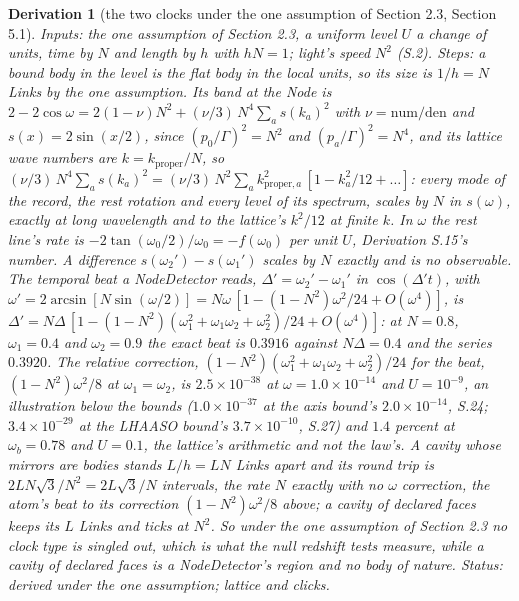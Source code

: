 \documentclass[pdflatex,sn-mathphys-num]{sn-jnl}
\newcommand{\num}{\mathrm{num}}
\newcommand{\den}{\mathrm{den}}
\theoremstyle{thmstyleone}
\newtheorem{derivation}{Derivation}
\begin{document}
\begin{derivation}[the two clocks under the one assumption of Section 2.3, Section 5.1]
\emph{Inputs:} the one assumption of Section 2.3, a uniform level $U$ a change of units, time by $N$ and length by $h$ with $hN = 1$; light's speed $N^2$ (S.2). \emph{Steps:} a bound body in the level is the flat body in the local units, so its size is $1 / h = N$ Links by the one assumption. Its band at the Node is $2 - 2\cos\omega = 2(1 - \nu)N^2 + (\nu / 3)\,N^4\sum_a s(k_a)^2$ with $\nu = \num / \den$ and $s(x) = 2\sin(x / 2)$, since $(p_0 / \Gamma)^2 = N^2$ and $(p_a / \Gamma)^2 = N^4$, and its lattice wave numbers are $k = k_{\mathrm{proper}} / N$, so $(\nu / 3)\,N^4\sum_a s(k_a)^2 = (\nu / 3)\,N^2\sum_a k_{\mathrm{proper}, a}^2\,[1 - k_a^2 / 12 + \dots]$: every mode of the record, the rest rotation and every level of its spectrum, scales by $N$ in $s(\omega)$, exactly at long wavelength and to the lattice's $k^2 / 12$ at finite $k$. In $\omega$ the rest line's rate is $-2\tan(\omega_0 / 2) / \omega_0 = -f(\omega_0)$ per unit $U$, Derivation S.15's number. A difference $s(\omega_2') - s(\omega_1')$ scales by $N$ exactly and is no observable. The temporal beat a NodeDetector reads, $\Delta' = \omega_2' - \omega_1'$ in $\cos(\Delta' t)$, with $\omega' = 2\arcsin[N\sin(\omega / 2)] = N\omega\,[1 - (1 - N^2)\omega^2 / 24 + O(\omega^4)]$, is $\Delta' = N\Delta\,[1 - (1 - N^2)(\omega_1^2 + \omega_1\omega_2 + \omega_2^2) / 24 + O(\omega^4)]$: at $N = 0.8$, $\omega_1 = 0.4$ and $\omega_2 = 0.9$ the exact beat is $0.3916$ against $N\Delta = 0.4$ and the series $0.3920$. The relative correction, $(1 - N^2)(\omega_1^2 + \omega_1\omega_2 + \omega_2^2) / 24$ for the beat, $(1 - N^2)\omega^2 / 8$ at $\omega_1 = \omega_2$, is $2.5 \times 10^{-38}$ at $\omega = 1.0 \times 10^{-14}$ and $U = 10^{-9}$, an illustration below the bounds ($1.0 \times 10^{-37}$ at the axis bound's $2.0 \times 10^{-14}$, S.24; $3.4 \times 10^{-29}$ at the LHAASO bound's $3.7 \times 10^{-10}$, S.27) and $1.4$ percent at $\omega_b = 0.78$ and $U = 0.1$, the lattice's arithmetic and not the law's. A cavity whose mirrors are bodies stands $L / h = LN$ Links apart and its round trip is $2LN\sqrt 3 / N^2 = 2L\sqrt 3 / N$ intervals, the rate $N$ exactly with no $\omega$ correction, the atom's beat to its correction $(1 - N^2)\omega^2 / 8$ above; a cavity of declared faces keeps its $L$ Links and ticks at $N^2$. So under the one assumption of Section 2.3 no clock type is singled out, which is what the null redshift tests measure, while a cavity of declared faces is a NodeDetector's region and no body of nature.
 \emph{Status:} derived under the one assumption; lattice and clicks.
\end{derivation}
\end{document}
